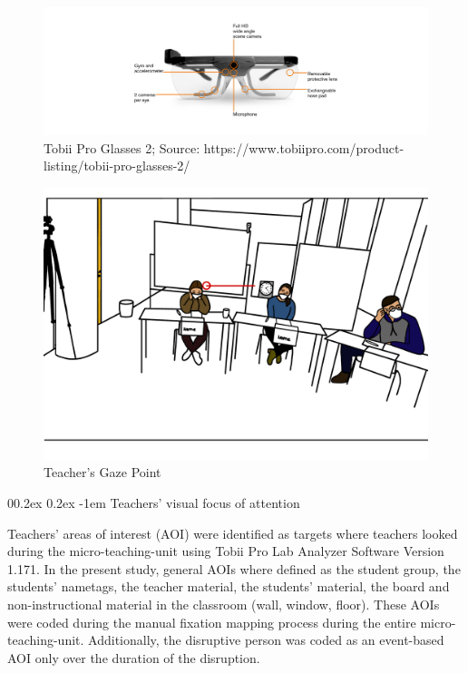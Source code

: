 \documentclass[
  man]{apa6}
\makeatletter
\let\oldparagraph\paragraph
\renewcommand{\paragraph}{
    \@ifstar
      \xxxParagraphStar
      \xxxParagraphNoStar
  }
\newcommand{\xxxParagraphStar}[1]{\oldparagraph*{#1}\mbox{}}
\newcommand{\xxxParagraphNoStar}[1]{\oldparagraph{#1}\mbox{}}
\renewcommand{\paragraph}{\@startsection{paragraph}{4}{\parindent}%
  {0\baselineskip \@plus 0.2ex \@minus 0.2ex}%
  {-1em}%
  {\normalfont\normalsize\bfseries\itshape\typesectitle}}
\makeatother
\begin{document}
\begin{figure}

{\centering \includegraphics[width=14.07in]{./pictures/tobiiglasses2} 

}

\caption{Tobii Pro Glasses 2; Source: https://www.tobiipro.com/product-listing/tobii-pro-glasses-2/}\label{fig:tobiiglasses2}
\end{figure}

\begin{figure}

{\centering \includegraphics{./pictures/teachersgaze} 

}

\caption{Teacher's Gaze Point}\label{fig:teachersgaze}
\end{figure}

\paragraph{Teachers' visual focus of attention}\label{teachers-visual-focus-of-attention}

Teachers' areas of interest (AOI) were identified as targets where teachers looked during the micro-teaching-unit using Tobii Pro Lab Analyzer Software Version 1.171. In the present study, general AOIs where defined as the student group, the students' nametags, the teacher material, the students' material, the board and non-instructional material in the classroom (wall, window, floor). These AOIs were coded during the manual fixation mapping process during the entire micro-teaching-unit. Additionally, the disruptive person was coded as an event-based AOI only over the duration of the disruption.
\end{document}
